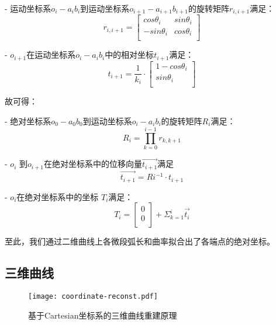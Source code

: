 - 运动坐标系$o_i-a_ib_i$到运动坐标系$o_{i+1}-a_{i+1}b_{i+1}$的旋转矩阵$r_{i, i+1}$满足：
    \begin{equation}
    r_{i, i+1} = \left[
      \begin{matrix}
      cos \theta_i & sin \theta_i\\
      -sin \theta_i & cos \theta_i\\
      \end{matrix}
    \right]
    \end{equation}
    
- $o_{i+1}$在运动坐标系$o_i-a_ib_i$中的相对坐标$t_{i+1}$满足：
    \begin{equation}
    t_{i+1} = \frac{1}{k_i} \cdot \left[
      \begin{matrix}
    	1 - cos\theta_i\\
      sin\theta_i\\
      \end{matrix}
    \right]
    \end{equation}
    

故可得：

- 绝对坐标系$o_0-a_0b_0$到运动坐标系$o_i-a_ib_i$的旋转矩阵$R_i$满足：
    \begin{equation}
    R_i = \prod_{k = 0}^{i-1} r_{k, k+1}
    \end{equation}

- $o_i$ 到$o_{i+1}$在绝对坐标系中的位移向量$\vec{t_{i+1}}$满足
    \begin{equation}
    \vec{t_{i+1}} = Ri^{-1}\cdot t_{i+1}
    \end{equation}
    
- $o_i$在绝对坐标系中的坐标 $T_i$满足：
    \begin{equation}
    T_i = \left[
    		\begin{matrix}
        0\\
        0\\
      	\end{matrix}
      \right]
      + \Sigma_{k=1} ^ {i} \vec{t_i}
    \end{equation}
    
至此，我们通过二维曲线上各微段弧长和曲率拟合出了各端点的绝对坐标。

\subsection{三维曲线}

\begin{figure}
\centering
\texttt{[image: coordinate-reconst.pdf]}
\caption{基于Cartesian坐标系的三维曲线重建原理}
\label{fig:coordinate-reconst} 
\end{figure}


